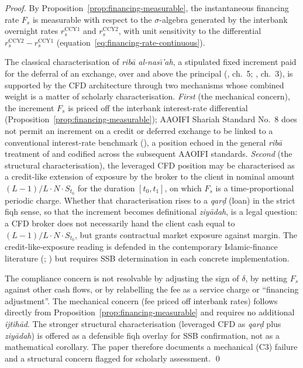 \documentclass[preprint,12pt,authoryear]{elsarticle}
\theoremstyle{definition}
\begin{document}
\begin{proof}
By Proposition~\ref{prop:financing-measurable}, the instantaneous
financing rate $F_s$ is measurable with respect to the
$\sigma$-algebra generated by the interbank overnight rates
$r^{\text{CCY1}}_{s}$ and $r^{\text{CCY2}}_{s}$, with unit
sensitivity to the differential
$r^{\text{CCY2}}_{s} - r^{\text{CCY1}}_{s}$
(equation~\eqref{eq:financing-rate-continuous}).

The classical characterisation of \emph{rib\={a} al-nas\={\i}'ah},
a stipulated fixed increment paid for the deferral of an
exchange, over and above the principal
(\citealp{Kamali2000}, ch.~5; \citealp{Usmani2002}, ch.~3), is
supported by the CFD architecture through two mechanisms whose
combined weight is a matter of scholarly characterisation.
\emph{First} (the mechanical concern), the increment $F_s$ is
priced off the interbank interest-rate differential
(Proposition~\ref{prop:financing-measurable}); AAOIFI Shariah
Standard No.~8 does not permit an increment on a credit or
deferred exchange to be linked to a conventional interest-rate
benchmark (\citealp{AAOIFI2015}), a position echoed in the
general \emph{rib\={a}} treatment of \citet{Usmani2002} and
codified across the subsequent AAOIFI standards. \emph{Second}
(the structural characterisation), the leveraged CFD position
may be characterised as a credit-like extension of exposure by
the broker to the client in nominal amount
$(L-1)/L \cdot N \cdot S_{t_0}$ for the duration $[t_0, t_1]$,
on which $F_s$ is a time-proportional periodic charge. Whether
that characterisation rises to a \emph{qar\d{d}} (loan) in the
strict fiqh sense, so that the increment becomes definitional
\emph{ziy\={a}dah}, is a legal question: a CFD broker does not
necessarily hand the client cash equal to
$(L-1)/L \cdot N \cdot S_{t_0}$, but grants contractual market
exposure against margin. The credit-like-exposure reading is
defended in the contemporary Islamic-finance literature
(\citealp{Usmani2002}; \citealp{Kamali2000}) but requires SSB
determination in each concrete implementation.

The compliance concern is not resolvable by adjusting the sign of
$\delta$, by netting $F_s$ against other cash flows, or by
relabelling the fee as a service charge or ``financing
adjustment''. The mechanical concern (fee priced off interbank
rates) follows directly from
Proposition~\ref{prop:financing-measurable} and requires no
additional \emph{ijtih\={a}d}. The stronger structural
characterisation (leveraged CFD as \emph{qar\d{d}} plus
\emph{ziy\={a}dah}) is offered as a defensible fiqh overlay for
SSB confirmation, not as a mathematical corollary. The paper
therefore documents a mechanical (C3) failure and a structural
concern flagged for scholarly assessment. \qed
\end{proof}
\end{document}
